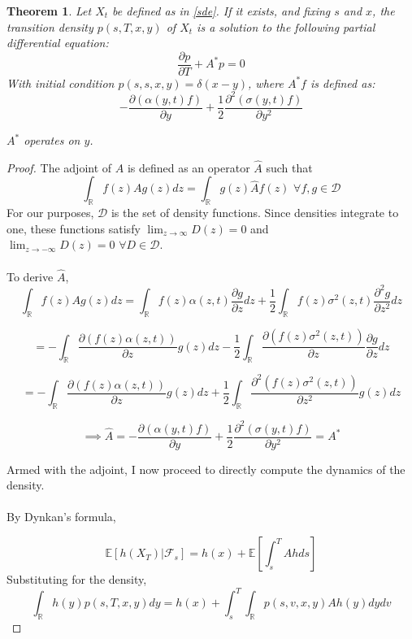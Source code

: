 \documentclass{article}
\newtheorem{theorem}{Theorem}
\theoremstyle{definition}
\begin{document}
\begin{theorem}\label{fk}
	Let \(X_t\) be defined as in \ref{sde}.  If it exists, and fixing \(s\) and \(x\), the transition density \(p(s, T, x, y)\) of \(X_t\) is a solution to the following partial differential equation:
	\[\frac{\partial p}{\partial T} + A^*p=0 \]
	With initial condition \(p(s, s, x, y)=\delta(x-y)\), where \(A^*f\) is defined as: \[-\frac{\partial \left(\alpha(y, t) f\right)}{\partial y} + \frac{1}{2}\frac{\partial^2 \left(\sigma(y, t) f\right) } {\partial y^2}   \]
	
	\(A^*\) operates on \(y\).
\end{theorem}
\begin{proof}
	The adjoint of \(A\) is defined as an operator \(\hat{A}\) such that 
	\[\int_\mathbb{R} f(z) A g(z) dz = \int_\mathbb{R} g(z) \hat{A} f(z)\,\,\forall f, g \in \mathcal{D}   \]
	For our purposes, \(\mathcal{D}\) is the set of density functions.  Since densities integrate to one, these functions satisfy \(\lim_{z \to \infty } D(z) =0 \) and \(\lim_{z \to -\infty} D(z)=0\,\,\forall D \in \mathcal{D}\).
	\\
	\\
	To derive \(\hat{A}\),  
	\[\int_\mathbb{R} f(z) A g(z) dz  = \int_\mathbb{R}  f(z)  \alpha(z, t) \frac{\partial g}{\partial z} dz+\frac{1}{2} \int_\mathbb{R} f(z)\sigma^2(z, t) \frac{\partial^2 g}{\partial z^2} dz \]
	
	\[= - \int_\mathbb{R}  \frac{\partial \left( f(z)  \alpha(z, t) \right)}{\partial z} g(z) dz -\frac{1}{2} \int_\mathbb{R} \frac{\partial \left(f(z)\sigma^2(z, t)\right) }{\partial z} \frac{\partial g}{\partial z} dz   \]
	
	\[ = - \int_\mathbb{R}  \frac{\partial \left( f(z)  \alpha(z, t) \right)}{\partial z} g(z) dz +\frac{1}{2} \int_\mathbb{R} \frac{\partial ^2 \left(f(z)\sigma^2(z, t) \right)}{\partial z^2} g(z) dz   \]
	
	
	\[ \implies \hat{A}= -\frac{\partial \left(\alpha(y, t) f\right)}{\partial y} + \frac{1}{2}\frac{\partial^2 \left(\sigma(y, t) f\right) } {\partial y^2} =A^* \]
	
	Armed with the adjoint, I now proceed to directly compute the dynamics of the density.  
	\\
	\\
	By Dynkan's formula,
	
	\[ \mathbb{E}[h(X_T)|\mathcal{F}_s]= h(x)+\mathbb{E}\left[\int_s^T A h ds \right]  \]
	Substituting for the density, 
	\[\int_\mathbb{R} h(y) p(s, T, x, y) dy = h(x)+ \int_s^T  \int_\mathbb{R}p(s, v, x, y) A h(y)   dy dv   \]
	

\end{proof}
\end{document}
